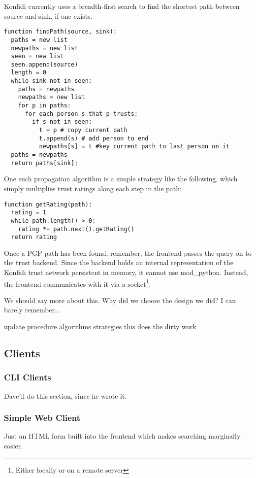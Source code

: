 \documentclass[onecolumn]{acm_proc_article-sp}
\begin{document}
Konfidi currently uses a breadth-first search to find the shortest path between source and sink, if one exists.
\begin{verbatim}
function findPath(source, sink):
  paths = new list
  newpaths = new list
  seen = new list
  seen.append(source)
  length = 0
  while sink not in seen:
    paths = newpaths
    newpaths = new list
    for p in paths:
      for each person s that p trusts:
        if s not in seen:
          t = p # copy current path
          t.append(s) # add person to end
          newpaths[s] = t #key current path to last person on it
  paths = newpaths
  return paths[sink];
\end{verbatim}

One such propagation algorithm is a simple strategy like the following, which simply multiplies trust ratings along each step in the path:
\begin{verbatim}
function getRating(path):
  rating = 1
  while path.length() > 0:
    rating *= path.next().getRating()
  return rating
\end{verbatim}

Once a PGP path has been found, remember, the frontend passes the query on to the trust backend.  Since the backend holds an internal representation of the Konfidi trust network persistent in memory, it cannot use mod\_python.  Instead, the frontend communicates with it via a socket\footnote{Either locally or on a remote server}.

We should say more about this.  Why did we choose the design we did?  I can barely remember...

update procedure
algorithms
strategies
this does the dirty work

\subsection{Clients}
\subsubsection{CLI Clients}
Dave'll do this section, since he wrote it.
\subsubsection{Simple Web Client}
Just an HTML form built into the frontend which makes searching marginally easier.
\end{document}
